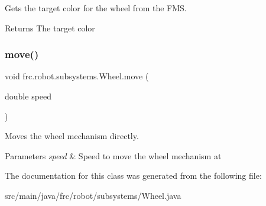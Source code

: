 Gets the target color for the wheel from the F\+MS. 

\begin{DoxyReturn}{Returns}
The target color 
\end{DoxyReturn}
\mbox{\label{classfrc_1_1robot_1_1subsystems_1_1_wheel_afcc64ab79a1f9902f6270d699d01a4ef}} 
\subsubsection{\texorpdfstring{move()}{move()}}
{\footnotesize\ttfamily void frc.\+robot.\+subsystems.\+Wheel.\+move (\begin{DoxyParamCaption}\item[{double}]{speed }\end{DoxyParamCaption})\hspace{0.3cm}{\ttfamily [inline]}}



Moves the wheel mechanism directly. 


\begin{DoxyParams}{Parameters}
{\em speed} & Speed to move the wheel mechanism at \\
\hline
\end{DoxyParams}


The documentation for this class was generated from the following file\+:\begin{DoxyCompactItemize}
\item 
src/main/java/frc/robot/subsystems/Wheel.\+java\end{DoxyCompactItemize}
